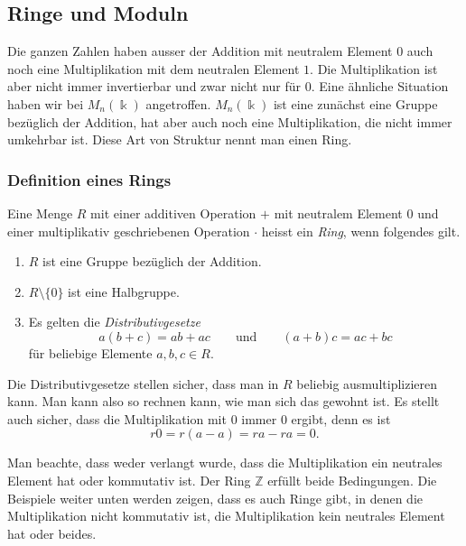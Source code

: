 %
%
%
\subsection{Ringe und Moduln
\label{buch:grundlagen:subsection:ringe}}
Die ganzen Zahlen haben ausser der Addition mit neutralem Element $0$
auch noch eine Multiplikation mit dem neutralen Element $1$.
Die Multiplikation ist aber nicht immer invertierbar und zwar
nicht nur für $0$.
Eine ähnliche Situation haben wir bei $M_n(\Bbbk)$ angetroffen.
$M_n(\Bbbk)$ ist eine zunächst eine Gruppe bezüglich der Addition,
hat aber auch noch eine Multiplikation, die nicht immer umkehrbar ist.
Diese Art von Struktur nennt man einen Ring.

\subsubsection{Definition eines Rings}

\begin{definition}
%
Eine Menge $R$ mit einer additiven Operation $+$ mit neutralem Element
$0$ und einer multiplikativ geschriebenen Operation $\cdot$ heisst ein
{\em Ring}, wenn folgendes gilt.
%
\begin{enumerate}
\item
$R$ ist eine Gruppe bezüglich der Addition.
\item
$R\setminus\{0\}$ ist eine Halbgruppe.
\item
Es gelten die {\em Distributivgesetze}
\[
a(b+c)=ab+ac
\qquad\text{und}\qquad
(a+b)c=ac+bc
\]
für beliebige Elemente $a,b,c\in R$.
%
\end{enumerate}
\end{definition}

Die Distributivgesetze stellen sicher, dass man in $R$ beliebig
ausmultiplizieren kann.
Man kann also so rechnen kann, wie man sich das gewohnt ist.
Es stellt auch sicher, dass die Multiplikation mit $0$ immer $0$
ergibt, denn es ist
\[
r0 = r(a-a) = ra-ra=0.
\]

Man beachte, dass weder verlangt wurde, dass die Multiplikation
ein neutrales Element hat oder kommutativ ist.
Der Ring $\mathbb{Z}$ erfüllt beide Bedingungen.
Die Beispiele weiter unten werden zeigen, dass es auch Ringe gibt,
in denen die Multiplikation nicht kommutativ ist, die Multiplikation
kein neutrales Element hat oder beides.

